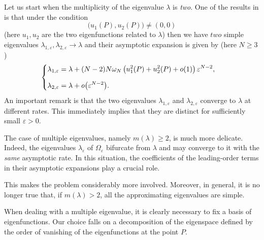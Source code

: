 \documentclass[11pt,reqno]{article}
\numberwithin{equation}{section}
\newcommand\e\varepsilon
\newcommand\la\lambda
\renewcommand\o\omega
\begin{document}
Let us start when the multiplicity of the eigenvalue $\la$ is {\em two}. One of the results in \cite{alm1,alm2} is that under the condition
\begin{equation}\label{ii1}
\big(u_1(P),u_2(P)\big)\ne(0,0)
\end{equation}
(here $u_1,u_2$ are the two eigenfunctions
related to $\la$) then we have $two$ simple eigenvalues $\la_{1,\e},\la_{2,\e}\to\la$ and their asymptotic expansion is given by (here $N\ge3$)
\begin{equation}
        \begin{cases}
            \la_{1,\e}=\displaystyle\la +(N-2)N\o_N\left(u_1^2(P)+u_2^2(P)+o(1)\right)\e^{N-2}, \vspace{3mm}\\
            \la_{2,\e}=\displaystyle\la +o\big(\e^{N-2}\big).
        \end{cases}
			\end{equation}
            An important remark is that the two eigenvalues $\la_{1,\e}$ and $\la_{2,\e}$ converge to $\lambda$ at different rates. This immediately implies that they are distinct for sufficiently small $\e>0$.

The case of multiple eigenvalues, namely $m(\lambda)\ge 2$, is much more delicate. Indeed, %
the eigenvalues $\lambda_\varepsilon$ of $\Omega_\varepsilon$ bifurcate from $\lambda$ and may converge to it with the {\em same} asymptotic rate. In this situation, the coefficients of the leading-order terms in their asymptotic expansions play a crucial role.

This makes the problem considerably more involved. Moreover, in general, it is no longer true that, if $m(\lambda)>2$, all the approximating eigenvalues are simple.

When dealing with a multiple eigenvalue, it is clearly necessary to fix a basis of eigenfunctions. Our choice falls on a decomposition of the eigenspace defined by the order of vanishing of the eigenfunctions at the point $P$.
 
\end{document}
